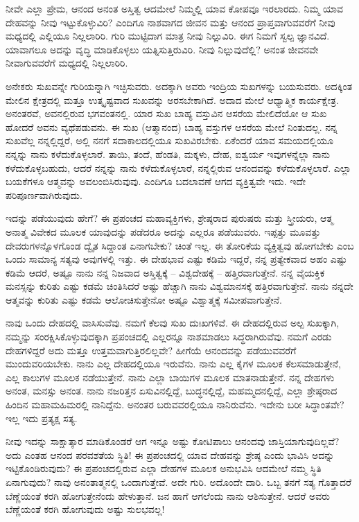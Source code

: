 ನೀವೇ ಎಲ್ಲಾ ಪ್ರೇಮ, ಆನಂದ ಅನಂತ ಅಸ್ತಿತ್ವ ಆದಮೇಲೆ ನಿಮ್ಮಲ್ಲಿ ಯಾವ ಕೋಪವೂ ಇರಲಾರದು. ನಿಮ್ಮ ಯಾವ ದೇಹವನ್ನು ನೀವು ಇಟ್ಟುಕೊಳ್ಳುವಿರಿ? ಎಂದಿಗೂ ನಾಶವಾಗದ ಜೀವನ ಮತ್ತು ಆನಂದ ಪ್ರಾಪ್ತವಾಗುವವರೆಗೆ ನೀವು ಮಧ್ಯದಲ್ಲಿ ಎಲ್ಲಿಯೂ ನಿಲ್ಲಲಾರಿರಿ. ಗುರಿ ಮುಟ್ಟಿದಾಗ ಮಾತ್ರ ನೀವು ನಿಲ್ಲುವಿರಿ. ಈಗ ನಿಮಗೆ ಸ್ವಲ್ಪ ಜ್ಞಾನವಿದೆ. ಯಾವಾಗಲೂ ಅದನ್ನು ವೃದ್ಧಿ ಮಾಡಿಕೊಳ್ಳಲು ಯತ್ನಿಸುತ್ತಿರುವಿರಿ. ನೀವು ನಿಲ್ಲುವುದೆಲ್ಲಿ? ಅನಂತ ಜೀವನವೇ ನೀವಾಗುವವರೆಗೆ ಮಧ್ಯದಲ್ಲಿ ನಿಲ್ಲಲಾರಿರಿ.

ಅನೇಕರು ಸುಖವನ್ನೇ ಗುರಿಯನ್ನಾಗಿ ಇಚ್ಛಿಸುವರು. ಅದಕ್ಕಾಗಿ ಅವರು ಇಂದ್ರಿಯ ಸುಖಗಳನ್ನು ಬಯಸುವರು. ಅದಕ್ಕಿಂತ ಮೇಲಿನ ಕ್ಷೇತ್ರದಲ್ಲಿ ಮತ್ತೂ ಉತ್ಕೃಷ್ಟವಾದ ಸುಖವನ್ನು ಅರಸಬೇಕಾಗಿದೆ. ಅದಾದ ಮೇಲೆ ಆಧ್ಯಾತ್ಮಿಕ ಕಾರ್ಯಕ್ಷೇತ್ರ. ಅನಂತರವೆ, ಅವನಲ್ಲಿರುವ ಭಗವಂತನಲ್ಲಿ. ಯಾರ ಸುಖ ಬಾಹ್ಯ ವಸ್ತುವಿನ ಆಸರೆಯ ಮೇಲಿದೆಯೋ ಆ ಸುಖ ಹೋದರೆ ಅವನು ವ್ಯಥೆಪಡುವನು. ಈ ಸುಖ (ಆತ್ಮಾನಂದ) ಬಾಹ್ಯ ವಸ್ತುಗಳ ಆಸರೆಯ ಮೇಲೆ ನಿಂತುದಲ್ಲ. ನನ್ನ ಸುಖವೆಲ್ಲ ನನ್ನಲ್ಲಿದ್ದರೆ, ಅಲ್ಲಿ ನನಗೆ ಸದಾಕಾಲದಲ್ಲಿಯೂ ಸುಖವಿರಬೇಕು. ಏಕೆಂದರೆ ಯಾವ ಸಮಯದಲ್ಲಿಯೂ ನನ್ನನ್ನು ನಾನು ಕಳೆದುಕೊಳ್ಳಲಾರೆ. ತಾಯಿ, ತಂದೆ, ಹೆಂಡತಿ, ಮಕ್ಕಳು, ದೇಹ, ಐಶ್ವರ್ಯ ಇವುಗಳನ್ನೆಲ್ಲಾ ನಾನು ಕಳೆದುಕೊಳ್ಳಬಹುದು, ಆದರೆ ನನ್ನನ್ನು ನಾನು ಕಳೆದುಕೊಳ್ಳಲಾರೆ, ನನ್ನಲ್ಲಿರುವ ಆನಂದವನ್ನು ಕಳೆದುಕೊಳ್ಳಲಾರೆ. ಎಲ್ಲಾ ಬಯಕೆಗಳೂ ಆತ್ಮವನ್ನು ಅವಲಂಬಿಸಿರುವುವು. ಎಂದಿಗೂ ಬದಲಾವಣೆ ಆಗದ ವ್ಯಕ್ತಿತ್ವವೇ ಇದು. ಇದೇ ಪರಿಪೂರ್ಣವಾಗಿರುವುದು.

ಇದನ್ನು ಪಡೆಯುವುದು ಹೇಗೆ? ಈ ಪ್ರಪಂಚದ ಮಹಾವ್ಯಕ್ತಿಗಳು, ಶ್ರೇಷ್ಠರಾದ ಪುರುಷರು ಮತ್ತು ಸ್ತ್ರೀಯರು, ಆತ್ಮ ಅನಾತ್ಮ ವಿವೇಕದ ಮೂಲಕ ಯಾವುದನ್ನು ಪಡೆದರೂ ಅದನ್ನು ಎಲ್ಲರೂ ಪಡೆಯುವರು. ಇಪ್ಪತ್ತು ಮೂವತ್ತು ದೇವರುಗಳನ್ನೊಳಗೊಂಡ ದ್ವೈತ ಸಿದ್ದಾಂತ ಏನಾಗಬೇಕು? ಚಿಂತೆ ಇಲ್ಲ. ಈ ತೋರಿಕೆಯ ವ್ಯಕ್ತಿತ್ವವು ಹೋಗಬೇಕು ಎಂಬ ಒಂದು ಸಾಮಾನ್ಯ ಸತ್ಯವು ಅವುಗಳಲ್ಲಿ ಇತ್ತು. ಈ ದೇಹಭಾವ ಎಷ್ಟು ಕಡಿಮೆ ಇದ್ದರೆ, ನನ್ನ ಪ್ರತ್ಯೇಕವಾದ ಅಹಂ ಎಷ್ಟು ಕಡಿಮೆ ಆದರೆ, ಅಷ್ಟೂ ನಾನು ನನ್ನ ನಿಜವಾದ ಅಸ್ತಿತ್ವಕ್ಕೆ – ವಿಶ್ವದೇಹಕ್ಕೆ – ಹತ್ತಿರವಾಗುತ್ತೇನೆ. ನನ್ನ ವೈಯಕ್ತಿಕ ಮನಸ್ಸನ್ನು ಕುರಿತು ಎಷ್ಟು ಕಡಮೆ ಚಿಂತಿಸಿದರೆ ಅಷ್ಟು ಹೆಚ್ಚಾಗಿ ನಾನು ವಿಶ್ವಮಾನಸಕ್ಕೆ ಹತ್ತಿರವಾಗುತ್ತೇನೆ. ನಾನು ನನ್ನದೇ ಆತ್ಮವನ್ನು ಕುರಿತು ಎಷ್ಟು ಕಡಮೆ ಆಲೋಚಿಸುತ್ತೇನೋ ಅಷ್ಟೂ ವಿಶ್ವಾತ್ಮಕ್ಕೆ ಸಮೀಪವಾಗುತ್ತೇನೆ.

ನಾವು ಒಂದು ದೇಹದಲ್ಲಿ ವಾಸಿಸುವೆವು. ನಮಗೆ ಕೆಲವು ಸುಖ ದುಃಖಗಳಿವೆ. ಈ ದೇಹದಲ್ಲಿರುವ ಅಲ್ಪ ಸುಖಕ್ಕಾಗಿ, ನಮ್ಮನ್ನು ಸಂರಕ್ಷಿಸಿಕೊಳ್ಳುವುದಕ್ಕಾಗಿ ಪ್ರಪಂಚದಲ್ಲಿ ಎಲ್ಲರನ್ನೂ ನಾಶಮಾಡಲು ಸಿದ್ಧರಾಗಿರುವೆವು. ನಮಗೆ ಎರಡು ದೇಹಗಳಿದ್ದರೆ ಅದು ಮತ್ತೂ ಉತ್ತಮವಾಗುತ್ತಿರಲಿಲ್ಲವೇ? ಹೀಗೆಯೆ ಆನಂದವನ್ನು ಪಡೆಯುವವರೆಗೆ ಮುಂದುವರಿಯಬೇಕು. ನಾನು ಎಲ್ಲ ದೇಹದಲ್ಲಿಯೂ ಇರುವೆನು. ನಾನು ಎಲ್ಲ ಕೈಗಳ ಮೂಲಕ ಕೆಲಸಮಾಡುತ್ತೇನೆ, ಎಲ್ಲ ಕಾಲುಗಳ ಮೂಲಕ ನಡೆಯುತ್ತೇನೆ. ನಾನು ಎಲ್ಲಾ ಬಾಯಿಗಳ ಮೂಲಕ ಮಾತನಾಡುತ್ತೇನೆ. ನನ್ನ ದೇಹಗಳು ಅನಂತ, ಮನಸ್ಸು ಅನಂತ. ನಾನು ನಜರಿತ್ತನ ಏಸುವಿನಲ್ಲಿದ್ದೆ, ಬುದ್ಧನಲ್ಲಿದ್ದೆ, ಮಹಮ್ಮದನಲ್ಲಿದ್ದೆ, ಎಲ್ಲಾ ಶ್ರೇಷ್ಠರಾದ ಹಿಂದಿನ ಮಹಾಮಹಿಮರಲ್ಲಿ ನಾನಿದ್ದೆನು. ಅನಂತರ ಬರುವವರಲ್ಲಿಯೂ ನಾನಿರುವೆನು. ಇದೇನು ಬರೀ ಸಿದ್ಧಾಂತವೇ? ಇಲ್ಲ ಇದು ಪ್ರತ್ಯಕ್ಷ ಸತ್ಯ.

ನೀವು ಇದನ್ನು ಸಾಕ್ಷಾತ್ಕಾರ ಮಾಡಿಕೊಂಡರೆ ಆಗ ಇನ್ನೂ ಅಷ್ಟು ಕೋಟಿಪಾಲು ಆನಂದವು ಜಾಸ್ತಿಯಾಗುವುದಿಲ್ಲವೆ? ಅದು ಎಂತಹ ಆನಂದ ಪರವಶತೆಯ ಸ್ಥಿತಿ! ಈ ಪ್ರಪಂಚದಲ್ಲಿ ಯಾವ ದೇಹವನ್ನು ಶ್ರೇಷ್ಠ ಎಂದು ಭಾವಿಸಿ ಅದನ್ನು ಇಟ್ಟಿಕೊಂಡಿರುವುದು? ಈ ಪ್ರಪಂಚದಲ್ಲಿರುವ ಎಲ್ಲಾ ದೇಹಗಳ ಮೂಲಕ ಅನುಭವಿಸಿ ಆದಮೇಲೆ ನಮ್ಮ ಸ್ಥಿತಿ ಏನಾಗುವುದು? ನಾವು ಅನಂತಾತ್ಮನಲ್ಲಿ ಒಂದಾಗುತ್ತೇವೆ. ಅದೇ ಗುರಿ. ಅದೊಂದೇ ದಾರಿ. ಒಬ್ಬ ತನಗೆ ಸತ್ಯ ಗೊತ್ತಾದರೆ ಬೆಣ್ಣೆಯಂತೆ ಕರಗಿ ಹೋಗುತ್ತೇನೆಂದು ಹೇಳುತ್ತಾನೆ. ಜನ ಹಾಗೆ ಆಗಲೆಂದು ನಾನು ಆಶಿಸುತ್ತೇನೆ. ಆದರೆ ಅವರು ಬೆಣ್ಣೆಯಂತೆ ಕರಗಿ ಹೋಗುವುದು ಅಷ್ಟು ಸುಲಭವಲ್ಲ!

